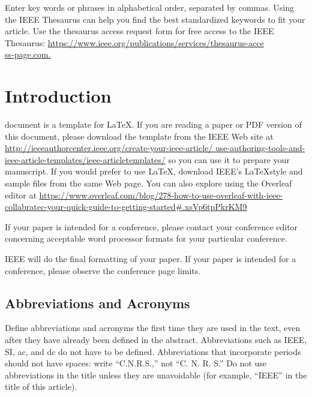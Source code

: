 \documentclass[journal,twoside,web]{ieeecolor}
\begin{document}
\begin{IEEEkeywords}
Enter key words or phrases in alphabetical order, separated by commas. Using the IEEE Thesaurus can help you find the best standardized keywords to fit your article. Use the thesaurus access request form for free access to the IEEE Thesaurus: \underline{https://www.ieee.org/publications/services/thesaurus-acce}\\
\underline{ss-page.com.}
\end{IEEEkeywords}

\section{Introduction}
\label{sec:introduction}
 document is a template for \LaTeX. If you are 
reading a paper or PDF version of this document, please download the 
template from the IEEE Web site at \underline
{http://ieeeauthorcenter.ieee.org/create-your-ieee-article/
use-}\discretionary{}{}{}\underline{authoring-tools-and-ieee-article-templates/ieee-articletemplates/} so you can use it to prepare your manuscript. If 
you would prefer to use \LaTeX, download IEEE's \LaTeX style and sample files 
from the same Web page. You can also explore using the Overleaf editor at 
\underline
{https://www.overleaf.com/blog/278-how-to-use-overleaf-with-}\discretionary{}{}{}\underline
{ieee-collabratec-your-quick-guide-to-getting-started\#.}\discretionary{}{}{}\underline{xsVp6tpPkrKM9}

If your paper is intended for a conference, please contact your conference 
editor concerning acceptable word processor formats for your particular 
conference. 

IEEE will do the final formatting of your paper. If your paper is intended 
for a conference, please observe the conference page limits. 

\subsection{Abbreviations and Acronyms}
Define abbreviations and acronyms the first time they are used in the text, 
even after they have already been defined in the abstract. Abbreviations 
such as IEEE, SI, ac, and dc do not have to be defined. Abbreviations that 
incorporate periods should not have spaces: write ``C.N.R.S.,'' not ``C. N. 
R. S.'' Do not use abbreviations in the title unless they are unavoidable 
(for example, ``IEEE'' in the title of this article).
\end{document}
